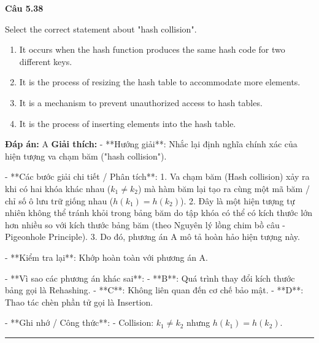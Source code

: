\documentclass[11pt,a4paper]{article}
\newenvironment{question}[1]{%
  \par\vspace{1em}\noindent\textbf{\large Câu #1}\par\vspace{0.4em}
}{%
  \par\vspace{1em}\hrule\vspace{0.6em}
}
\newenvironment{choices}{%
  \begin{enumerate}[label=\textbf{\Alph*.},leftmargin=2.2em,itemsep=2pt,topsep=3pt]
}{%
  \end{enumerate}
}
\newcommand{\choice}{\item}
\begin{document}
\begin{question}{5.38}
Select the correct statement about "hash collision".
\begin{choices}
\choice It occurs when the hash function produces the same hash code for two different keys.
\choice It is the process of resizing the hash table to accommodate more elements.
\choice It is a mechanism to prevent unauthorized access to hash tables.
\choice It is the process of inserting elements into the hash table.
\end{choices}
\textbf{Đáp án:} A
\textbf{Giải thích:} - **Hướng giải**:
  Nhắc lại định nghĩa chính xác của hiện tượng va chạm băm ("hash collision").

- **Các bước giải chi tiết / Phân tích**:
  1. Va chạm băm (Hash collision) xảy ra khi có hai khóa khác nhau (\(k_1 \neq k_2\)) mà hàm băm lại tạo ra cùng một mã băm / chỉ số ô lưu trữ giống nhau (\(h(k_1) = h(k_2)\)).
  2. Đây là một hiện tượng tự nhiên không thể tránh khỏi trong bảng băm do tập khóa có thể có kích thước lớn hơn nhiều so với kích thước bảng băm (theo Nguyên lý lồng chim bồ câu - Pigeonhole Principle).
  3. Do đó, phương án A mô tả hoàn hảo hiện tượng này.

- **Kiểm tra lại**:
  Khớp hoàn toàn với phương án A.

- **Vì sao các phương án khác sai**:
  - **B**: Quá trình thay đổi kích thước bảng gọi là Rehashing.
  - **C**: Không liên quan đến cơ chế bảo mật.
  - **D**: Thao tác chèn phần tử gọi là Insertion.

- **Ghi nhớ / Công thức**:
  - Collision: \(k_1 \neq k_2\) nhưng \(h(k_1) = h(k_2)\).
\end{question}
\end{document}
